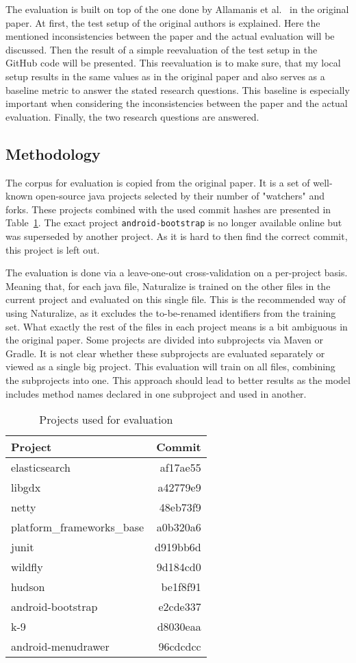 The evaluation is built on top of the one done by Allamanis et al.~\cite{naturalize} in the original paper. At first, the test setup of the original authors is explained. Here the mentioned inconsistencies between the paper and the actual evaluation will be discussed. Then the result of a simple reevaluation of the test setup in the GitHub code will be presented. This reevaluation is to make sure, that my local setup results in the same values as in the original paper and also serves as a baseline metric to answer the stated research questions. This baseline is especially important when considering the inconsistencies between the paper and the actual evaluation. Finally, the two research questions are answered.

\subsection{Methodology}
The corpus for evaluation is copied from the original paper. It is a set of well-known open-source java
projects selected by their number of "watchers" and forks. These projects combined with the used
commit hashes are presented in Table~\ref{tab:eval_projects}. The exact project \texttt{android-bootstrap} is no
longer available online but was superseded by another project. As it is hard to then find the correct commit, this project is left out.

The evaluation is done via a leave-one-out cross-validation on a per-project basis.
Meaning that, for each java file, Naturalize is trained on the other files in the current
project and evaluated on this single file. This is the recommended way of using Naturalize, as it excludes
the to-be-renamed identifiers from the training set. What exactly the rest of the files in each project means is a bit
ambiguous in the original paper. Some projects are divided into subprojects via Maven or Gradle. It is not clear whether these subprojects are evaluated separately or viewed as a single big project. This evaluation will train on all files, combining the subprojects into one. This approach should lead to better results as the model includes method names declared in one subproject and used in another.

\begin{table}
  \caption{Projects used for evaluation}
  \label{tab:eval_projects}
  \begin{tabular}{lr}
    \toprule
    Project&Commit\\
    \midrule
    elasticsearch&af17ae55\\
    libgdx&a42779e9\\
    netty&48eb73f9\\
    platform\_frameworks\_base&a0b320a6\\
    junit&d919bb6d\\
    wildfly&9d184cd0\\
    hudson&be1f8f91\\
    android-bootstrap&e2cde337\\
    k-9&d8030eaa\\
    android-menudrawer&96cdcdcc\\
    \bottomrule
\end{tabular}
\end{table}


